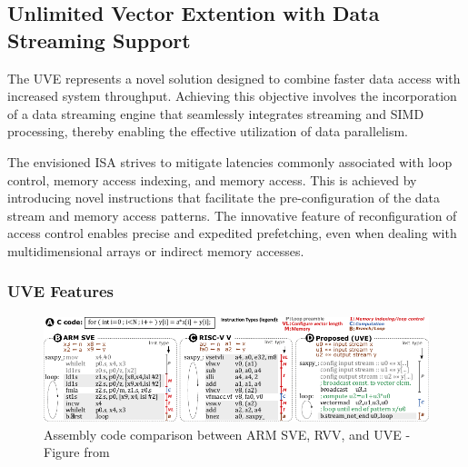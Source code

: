 \subsection{Unlimited Vector Extention with Data Streaming Support}
\label{label:uve}





The \acrfull{UVE} \cite{uve-paper} represents a novel solution designed to combine faster data access with increased system throughput. Achieving this objective involves the incorporation of a data streaming engine that seamlessly integrates streaming and SIMD processing, thereby enabling the effective utilization of data parallelism.

The envisioned \acrshort{ISA} strives to mitigate latencies commonly associated with loop control, memory access indexing, and memory access. This is achieved by introducing novel instructions that facilitate the pre-configuration of the data stream and memory access patterns. The innovative feature of reconfiguration of access control enables precise and expedited prefetching, even when dealing with multidimensional arrays or indirect memory accesses.


\subsubsection{UVE Features}

\begin{figure}[H]
    \centering
    \includegraphics[width=\linewidth]{images/UVE-Comparison.pdf}
    \caption{Assembly code comparison between ARM SVE, RVV, and UVE - Figure from \cite{uve-paper}}
    \label{fig:uve-comparison}
\end{figure}

